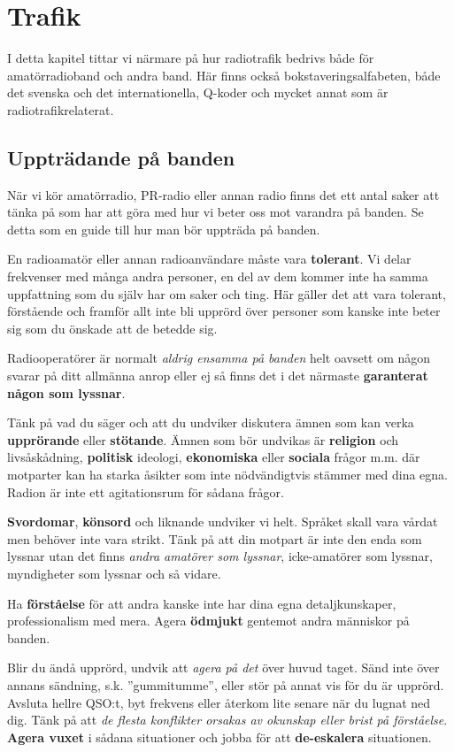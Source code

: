 \chapter{Trafik}

I detta kapitel tittar vi närmare på hur radiotrafik bedrivs både för amatörradioband och andra band. Här finns också bokstaveringsalfabeten, både det svenska och det internationella, Q-koder och mycket annat som är radio\-trafik\-relaterat.

\section{Uppträdande på banden}

När vi kör amatörradio, PR-radio eller annan radio finns det ett antal saker
att tänka på som har att göra med hur vi beter oss mot varandra på banden. Se
detta som en guide till hur man bör uppträda på banden.

En radioamatör eller annan radioanvändare måste vara \textbf{tolerant}. Vi
delar frekvenser med många andra personer, en del av dem kommer inte ha samma
uppfattning som du själv har om saker och ting. Här gäller det att vara
tolerant, förstående och framför allt inte bli upprörd över personer som
kanske inte beter sig som du önskade att de betedde sig.

Radiooperatörer är normalt \emph{aldrig ensamma på banden} helt oavsett om
någon svarar på ditt allmänna anrop eller ej så finns det i det närmaste
\textbf{garanterat någon som lyssnar}.

Tänk på vad du säger och att du undviker diskutera ämnen som kan verka
\textbf{upprörande} eller \textbf{stötande}. Ämnen som bör undvikas är
\textbf{religion} och livs\-å\-skå\-d\-ni\-ng, \textbf{politisk} ideologi,
\textbf{ekonomiska} eller \textbf{sociala} frågor m.m. där motparter kan ha
starka åsikter som inte nödvändigtvis stämmer med dina egna. Radion är inte ett
agitationsrum för sådana frågor.

\textbf{Svordomar}, \textbf{könsord} och liknande undviker vi helt. Språket
skall vara vårdat men behöver inte vara strikt. Tänk på att din motpart är inte
den enda som lyssnar utan det finns \textit{andra amatörer som lyssnar},
icke-amatörer som lyssnar, myndigheter som lyssnar och så vidare.

Ha \textbf{förståelse} för att andra kanske inte har dina egna detaljkunskaper,
professionalism med mera. Agera \textbf{ödmjukt} gentemot andra människor på
banden.

Blir du ändå upprörd, undvik att \emph{agera på det} över huvud taget. Sänd
inte över annans sändning, s.k. ''gummitumme'', eller stör på annat vis för du
är upprörd. Avsluta hellre QSO:t, byt frekvens eller återkom lite senare när
du lugnat ned dig. Tänk på att \textit{de flesta konflikter orsakas av
okunskap eller brist på förståelse}. \textbf{Agera vuxet} i sådana situationer
och jobba för att \textbf{de-eskalera} situationen.

